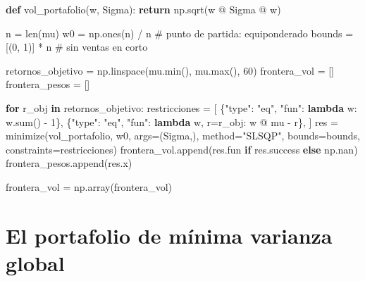 \documentclass[
  spanish,
  letterpaper,
  DIV=11,
  numbers=noendperiod]{scrreprt}
\newenvironment{Shaded}{\begin{snugshade}}{\end{snugshade}}
\newcommand{\BuiltInTok}[1]{\textcolor[rgb]{0.00,0.23,0.31}{#1}}
\newcommand{\CommentTok}[1]{\textcolor[rgb]{0.37,0.37,0.37}{#1}}
\newcommand{\ControlFlowTok}[1]{\textcolor[rgb]{0.00,0.23,0.31}{\textbf{#1}}}
\newcommand{\DecValTok}[1]{\textcolor[rgb]{0.68,0.00,0.00}{#1}}
\newcommand{\KeywordTok}[1]{\textcolor[rgb]{0.00,0.23,0.31}{\textbf{#1}}}
\newcommand{\NormalTok}[1]{\textcolor[rgb]{0.00,0.23,0.31}{#1}}
\newcommand{\OperatorTok}[1]{\textcolor[rgb]{0.37,0.37,0.37}{#1}}
\newcommand{\StringTok}[1]{\textcolor[rgb]{0.13,0.47,0.30}{#1}}
\begin{document}
\label{frontera}
\begin{Shaded}
\begin{Highlighting}[]
\KeywordTok{def}\NormalTok{ vol\_portafolio(w, Sigma):}
    \ControlFlowTok{return}\NormalTok{ np.sqrt(w }\OperatorTok{@}\NormalTok{ Sigma }\OperatorTok{@}\NormalTok{ w)}

\NormalTok{n }\OperatorTok{=} \BuiltInTok{len}\NormalTok{(mu)}
\NormalTok{w0 }\OperatorTok{=}\NormalTok{ np.ones(n) }\OperatorTok{/}\NormalTok{ n                      }\CommentTok{\# punto de partida: equiponderado}
\NormalTok{bounds }\OperatorTok{=}\NormalTok{ [(}\DecValTok{0}\NormalTok{, }\DecValTok{1}\NormalTok{)] }\OperatorTok{*}\NormalTok{ n                    }\CommentTok{\# sin ventas en corto}

\NormalTok{retornos\_objetivo }\OperatorTok{=}\NormalTok{ np.linspace(mu.}\BuiltInTok{min}\NormalTok{(), mu.}\BuiltInTok{max}\NormalTok{(), }\DecValTok{60}\NormalTok{)}
\NormalTok{frontera\_vol }\OperatorTok{=}\NormalTok{ []}
\NormalTok{frontera\_pesos }\OperatorTok{=}\NormalTok{ []}

\ControlFlowTok{for}\NormalTok{ r\_obj }\KeywordTok{in}\NormalTok{ retornos\_objetivo:}
\NormalTok{    restricciones }\OperatorTok{=}\NormalTok{ [}
\NormalTok{        \{}\StringTok{"type"}\NormalTok{: }\StringTok{"eq"}\NormalTok{, }\StringTok{"fun"}\NormalTok{: }\KeywordTok{lambda}\NormalTok{ w: w.}\BuiltInTok{sum}\NormalTok{() }\OperatorTok{{-}} \DecValTok{1}\NormalTok{\},}
\NormalTok{        \{}\StringTok{"type"}\NormalTok{: }\StringTok{"eq"}\NormalTok{, }\StringTok{"fun"}\NormalTok{: }\KeywordTok{lambda}\NormalTok{ w, r}\OperatorTok{=}\NormalTok{r\_obj: w }\OperatorTok{@}\NormalTok{ mu }\OperatorTok{{-}}\NormalTok{ r\},}
\NormalTok{    ]}
\NormalTok{    res }\OperatorTok{=}\NormalTok{ minimize(vol\_portafolio, w0, args}\OperatorTok{=}\NormalTok{(Sigma,),}
\NormalTok{                   method}\OperatorTok{=}\StringTok{"SLSQP"}\NormalTok{, bounds}\OperatorTok{=}\NormalTok{bounds, constraints}\OperatorTok{=}\NormalTok{restricciones)}
\NormalTok{    frontera\_vol.append(res.fun }\ControlFlowTok{if}\NormalTok{ res.success }\ControlFlowTok{else}\NormalTok{ np.nan)}
\NormalTok{    frontera\_pesos.append(res.x)}

\NormalTok{frontera\_vol }\OperatorTok{=}\NormalTok{ np.array(frontera\_vol)}
\end{Highlighting}
\end{Shaded}

\section{El portafolio de mínima varianza
global}\label{el-portafolio-de-muxednima-varianza-global}
\end{document}
